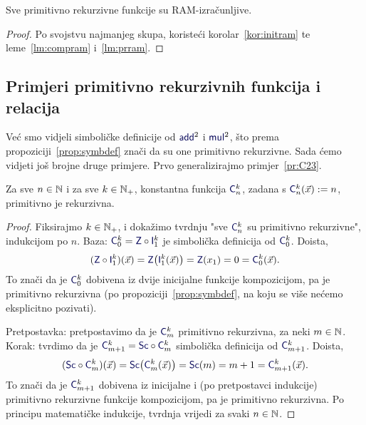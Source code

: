 \begin{propozicija}[{name=[RAM-izračunljivost primitivno rekurzivnih funkcija]}]\label{prop:prnram}
Sve primitivno rekurzivne funkcije su RAM-izračunljive.
\end{propozicija}
\begin{proof}
Po svojstvu najmanjeg skupa, koristeći korolar~\ref{kor:initram} te leme~\ref{lm:compram} i~\ref{lm:prram}.
\end{proof}

\subsection{Primjeri primitivno rekurzivnih funkcija i relacija}

Već smo vidjeli simboličke definicije od $\f{add}^2$ i $\f{mul}^2$, što prema propoziciji~\ref{prop:symbdef} znači da su one primitivno rekurzivne. Sada ćemo vidjeti još brojne druge primjere. Prvo generalizirajmo primjer~\ref{pr:C23}.

\begin{propozicija}[{name=[primitivna rekurzivnost konstantnih funkcija]}]\label{prop:konst}
Za sve $n\in{\mathbb N}$ i za sve $k\in{\mathbb N}_+$, konstantna funkcija $\f C_n^k$, zadana s $\f C_n^k(\vec x):=n$, primitivno je rekurzivna.
\end{propozicija}
\begin{proof}
Fiksirajmo $k\in{\mathbb N}_+$, i dokažimo tvrdnju "sve $\f C_n^k$ su primitivno rekurzivne", indukcijom po $n$. Baza: $\f C_0^k=\f Z\circ\f I_1^k$ je simbolička definicija od $\f C_0^k$. Doista,
\begin{equation}
    (\f Z\circ\f I_1^k)(\vec x)=\f Z\bigl(\f I_1^k(\vec x)\bigr)=\f Z(x_1)=0=\f C_0^k(\vec x)\text.
\end{equation}
To znači da je $\f C_0^k$ dobivena iz dvije inicijalne funkcije kompozicijom, pa je primitivno rekurzivna (po propoziciji~\ref{prop:symbdef}, na koju se više nećemo eksplicitno pozivati).

Pretpostavka: pretpostavimo da je $\f C_m^k$ primitivno rekurzivna, za neki $m\in{\mathbb N}$. 
Korak: tvrdimo da je $\f C_{m+1}^k=\f{Sc}\circ\f C_m^k$ simbolička definicija od $\f C_{m+1}^k$. Doista,
\begin{equation}
    (\f{Sc}\circ\f C_m^k)(\vec x)=\f{Sc}\bigl(\f C_m^k(\vec x)\bigr)=\f{Sc}(m)=m+1=\f C_{m+1}^k(\vec x)\text.
\end{equation}
To znači da je $\f C_{m+1}^k$ dobivena iz inicijalne i (po pretpostavci indukcije) primitivno rekurzivne funkcije kompozicijom, pa je primitivno rekurzivna. Po principu matematičke indukcije, tvrdnja vrijedi za svaki $n\in{\mathbb N}$.
\end{proof}

